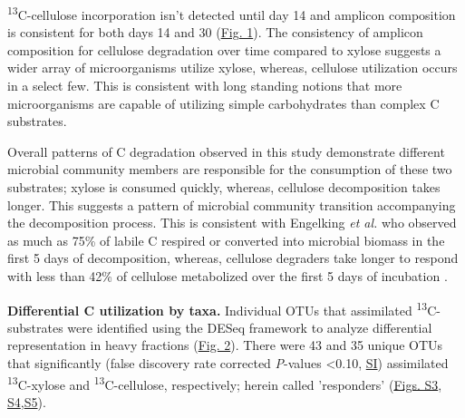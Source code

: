 \textsuperscript{13}C-cellulose incorporation isn't detected until day 14 and amplicon composition is consistent for both days 14 and 30 (\href{https://www.authorea.com/users/3537/articles/3612/master/file/figures/ordination_all1/ordination_all1.png}{Fig. 1}). The consistency of amplicon composition for cellulose degradation over time compared to xylose suggests a wider array of microorganisms utilize xylose, whereas, cellulose utilization occurs in a select few. This is consistent with long standing notions that more microorganisms are capable of utilizing simple carbohydrates than complex C substrates. 

Overall patterns of C degradation observed in this study demonstrate different microbial community members are responsible for the consumption of these two substrates; xylose is consumed quickly, whereas, cellulose decomposition takes longer. This suggests a pattern of microbial community transition accompanying the decomposition process. This is consistent with Engelking \textit{et al.}\cite{Engelking_2007} who observed as much as 75\% of labile C respired or converted into microbial biomass in the first 5 days of decomposition, whereas, cellulose degraders take longer to respond with less than 42\% of cellulose metabolized over the first 5 days of incubation \cite{Hu_1997}. 

\textbf{Differential C utilization by taxa.} Individual OTUs that assimilated \textsuperscript{13}C-substrates were identified using the DESeq framework \cite{Anders_Huber_2010} to analyze differential representation in heavy fractions (\href{https://www.authorea.com/users/3537/articles/3612/master/file/figures/l2fc_fig1/l2fc_fig.pdf}{Fig. 2}). There were 43 and 35 unique OTUs that significantly (false discovery rate corrected \textit{P}-values \textless 0.10, \href{https://authorea.com/users/3537/articles/8459/_show_article}{SI}) assimilated \textsuperscript{13}C-xylose and \textsuperscript{13}C-cellulose, respectively; herein called 'responders' (\href{https://www.authorea.com/users/3537/articles/8459/master/file/figures/OTU_screening_schematic/OTU_screening_schematic.pdf}{Figs. S3}, \href{https://www.authorea.com/users/3537/articles/8459/master/file/figures/l2fc_fig_pVal/l2fc_fig_pVal.png}{S4},\href{https://authorea.com/users/3537/articles/8459/master/file/figures/manhattan/manhattan.png}{S5}).

